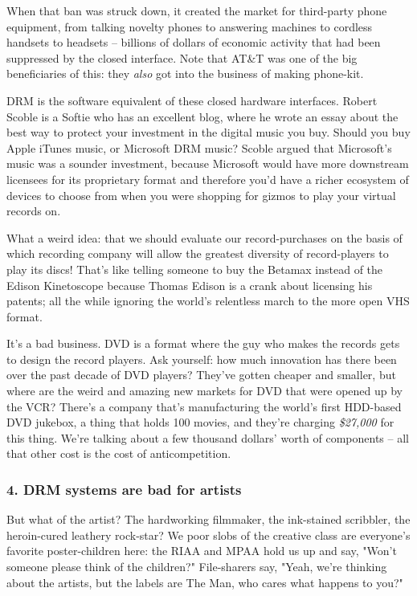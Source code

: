When that ban was struck down, it created the market for
third-party phone equipment, from talking novelty phones to
answering machines to cordless handsets to headsets -- billions of
dollars of economic activity that had been suppressed by the closed
interface. Note that AT\&T was one of the big beneficiaries of
this: they \emph{also} got into the business of making
phone-kit.

DRM is the software equivalent of these closed hardware interfaces.
Robert Scoble is a Softie who has an excellent blog, where he wrote
an essay about the best way to protect your investment in the
digital music you buy. Should you buy Apple iTunes music, or
Microsoft DRM music? Scoble argued that Microsoft's music was a
sounder investment, because Microsoft would have more downstream
licensees for its proprietary format and therefore you'd have a
richer ecosystem of devices to choose from when you were shopping
for gizmos to play your virtual records on.

What a weird idea: that we should evaluate our record-purchases on
the basis of which recording company will allow the greatest
diversity of record-players to play its discs! That's like telling
someone to buy the Betamax instead of the Edison Kinetoscope
because Thomas Edison is a crank about licensing his patents; all
the while ignoring the world's relentless march to the more open
VHS format.

It's a bad business. DVD is a format where the guy who makes the
records gets to design the record players. Ask yourself: how much
innovation has there been over the past decade of DVD players?
They've gotten cheaper and smaller, but where are the weird and
amazing new markets for DVD that were opened up by the VCR? There's
a company that's manufacturing the world's first HDD-based DVD
jukebox, a thing that holds 100 movies, and they're charging
\emph{\$27,000} for this thing. We're talking about a few
thousand dollars' worth of components -- all that other cost is the
cost of anticompetition.

\subsubsection{4. DRM systems are bad for artists}

But what of the artist? The hardworking filmmaker, the ink-stained
scribbler, the heroin-cured leathery rock-star? We poor slobs of
the creative class are everyone's favorite poster-children here:
the RIAA and MPAA hold us up and say, "Won't someone please think
of the children?" File-sharers say, "Yeah, we're thinking about the
artists, but the labels are The Man, who cares what happens to
you?"

